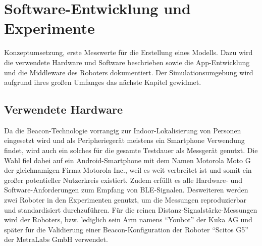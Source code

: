 \chapter{Software-Entwicklung und Experimente}
Konzeptumsetzung, erste Messwerte für die Erstellung eines Modells. Dazu wird die verwendete Hardware und Software beschrieben sowie die App-Entwicklung und die Middleware des Roboters dokumentiert. Der Simulationsumgebung wird aufgrund ihres großen Umfanges das nächste Kapitel gewidmet. 

\section{Verwendete Hardware}
Da die Beacon-Technologie vorrangig zur Indoor-Lokalisierung von Personen eingesetzt wird und als Peripheriegerät meistens ein Smartphone Verwendung findet, wird auch ein solches für die gesamte Testdauer als Messgerät genutzt. Die Wahl fiel dabei auf ein Android-Smartphone mit dem Namen Motorola Moto G der gleichnamigen Firma Motorola Inc., weil es weit verbreitet ist und somit ein großer potentieller Nutzerkreis existiert. Zudem erfüllt es alle Hardware- und Software-Anforderungen zum Empfang von BLE-Signalen. Desweiteren werden zwei Roboter in den Experimenten genutzt, um die Messungen reproduzierbar und standardisiert durchzuführen. Für die reinen Distanz-Signalstärke-Messungen wird der Roboters, bzw. lediglich sein Arm namens "`Youbot"' der Kuka AG und später für die Validierung einer Beacon-Konfiguration der Roboter "`Scitos G5"' der MetraLabs GmbH verwendet. 

